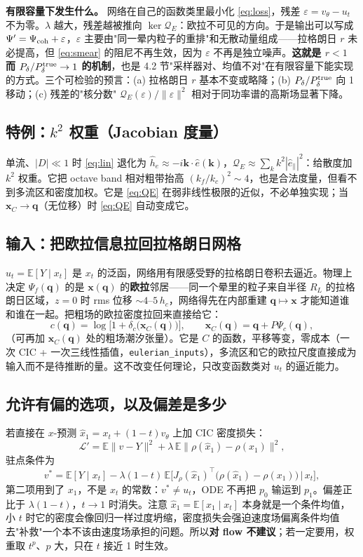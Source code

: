 \documentclass[11pt,UTF8,fontset=none]{ctexart}
\newcommand{\q}{\mathbf{q}}
\newcommand{\kk}{\mathbf{k}}
\newcommand{\x}{\mathbf{x}}
\newcommand{\E}{\mathbb{E}}
\newcommand{\Pd}{P_\delta}
\newcommand{\Psic}{\Psi_c}
\newcommand{\Psif}{\Psi_f}
\newcommand{\QE}{\mathcal Q_E}
\begin{document}
\textbf{有限容量下发生什么。} 网络在自己的函数类里最小化 \eqref{eq:loss}，残差 $\varepsilon=v_\theta-u_t$ 不为零。$\lambda$ 越大，残差越被推向 $\ker\QE$：欧拉不可见的方向。于是输出可以写成 $\Psi'=\Psi_{\rm coh}+\varepsilon$，$\varepsilon$ 主要由"同一晕内粒子的重排"和无散动量组成——拉格朗日 $r$ 未必提高，但 \eqref{eq:smear} 的阻尼不再生效，因为 $\varepsilon$ 不再是独立噪声。\textbf{这就是 $r<1$ 而 $\Pd/\Pd^{\rm true}\to1$ 的机制}，也是 4.2 节"采样器对、均值不对"在有限容量下能实现的方式。三个可检验的预言：(a) 拉格朗日 $r$ 基本不变或略降；(b) $\Pd/\Pd^{\rm true}$ 向 1 移动；(c) 残差的"核分数" $\QE(\varepsilon)/\|\varepsilon\|^2$ 相对于同功率谱的高斯场显著下降。

\subsection{特例：$k^2$ 权重（Jacobian 度量）}
单流、$|D|\ll1$ 时 \eqref{eq:lin} 退化为 $\hat h_e\approx-i\kk\cdot\hat e(\kk)$，$\QE\approx\sum_k k^2|\hat e_\parallel|^2$：给散度加 $k^2$ 权重。它把 octave band 相对粗带抬高 $(k_f/k_c)^2\sim4$，也是合法度量，但看不到多流区和密度加权。它是 \eqref{eq:QE} 在弱非线性极限的近似，不必单独实现；当 $\x_C\to\q$（无位移）时 \eqref{eq:QE} 自动变成它。

\subsection{输入：把欧拉信息拉回拉格朗日网格}
$u_t=\E[Y\mid x_t]$ 是 $x_t$ 的泛函，网络用有限感受野的拉格朗日卷积去逼近。物理上决定 $\Psif(\q)$ 的是 $\x(\q)$ 的\textbf{欧拉}邻居——同一个晕里的粒子来自半径 $R_L$ 的拉格朗日区域，$z=0$ 时 rms 位移 $\sim4$–$5\,h_c$，网络得先在内部重建 $\q\mapsto\x$ 才能知道谁和谁在一起。把粗场的欧拉密度拉回来直接给它：
\begin{equation}
c(\q)=\log\big[1+\delta_c\big(\x_C(\q)\big)\big],\qquad \x_C(\q)=\q+P\Psic(\q),
\end{equation}
（可再加 $\x_C(\q)$ 处的粗场潮汐张量）。它是 $C$ 的函数，平移等变，零成本（一次 CIC + 一次三线性插值，\texttt{eulerian\_inputs}），多流区和它的欧拉尺度直接成为输入而不是待推断的量。这不改变任何理论，只改变函数类对 $u_t$ 的逼近能力。

\subsection{允许有偏的选项，以及偏差是多少}
若直接在 $x$-预测 $\hat x_1=x_t+(1-t)v_\theta$ 上加 CIC 密度损失：
\begin{equation}
\mathcal L'=\E\|v-Y\|^2+\lambda\,\E\big\|\rho(\hat x_1)-\rho(x_1)\big\|^2,
\end{equation}
驻点条件为
\begin{equation}
v^*=\E[Y\mid x_t]-\lambda(1-t)\,\E\Big[J_\rho(\hat x_1)^{\!\top}\big(\rho(\hat x_1)-\rho(x_1)\big)\,\Big|\,x_t\Big],
\end{equation}
第二项用到了 $x_1$，不是 $x_t$ 的常数：$v^*\ne u_t$，ODE 不再把 $p_0$ 输运到 $p_1$。偏差正比于 $\lambda(1-t)$，$t\to1$ 时消失。注意 $\hat x_1=\E[x_1\mid x_t]$ 本身就是一个条件均值，小 $t$ 时它的密度会像回归一样过度坍缩，密度损失会强迫速度场偏离条件均值去"补救"一个本不该由速度场承担的问题。所以\textbf{对 flow 不建议}；若一定要用，权重取 $t^p$、$p$ 大，只在 $t$ 接近 1 时生效。
\end{document}
